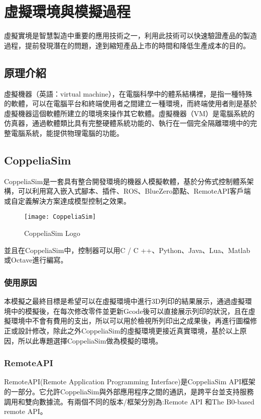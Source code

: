 \chapter{虛擬環境與模擬過程}

虛擬實境是智慧製造中重要的應用技術之一，利用此技術可以快速驗證產品的製造過程，提前發現潛在的問題，達到縮短產品上市的時間和降低生產成本的目的。\\

\section{原理介紹}

虛擬機器（英語：virtual machine），在電腦科學中的體系結構裡，是指一種特殊的軟體，可以在電腦平台和終端使用者之間建立一種環境，而終端使用者則是基於虛擬機器這個軟體所建立的環境來操作其它軟體。虛擬機器（VM）是電腦系統的仿真器，通過軟體類比具有完整硬體系統功能的、執行在一個完全隔離環境中的完整電腦系統，能提供物理電腦的功能。\\

\section{CoppeliaSim}
 CoppeliaSim是一套具有整合開發環境的機器人模擬軟體，基於分佈式控制體系架構，可以利用寫入嵌入式腳本、插件、ROS、BlueZero節點、RemoteAPI客戶端或自定義解決方案達成模型控制之效果。\\
\begin{figure}[htb]
\center
\texttt{[image: CoppeliaSim]}
\caption{\Large CoppeliaSim Logo}
\end{figure}

並且在CoppeliaSim中，控制器可以用C / C ++、Python、Java、Lua、Matlab或Octave進行編寫。\\
\subsection{使用原因}
 本模擬之最終目標是希望可以在虛擬環境中進行3D列印的結果展示，通過虛擬環境中的模擬後，在每次修改零件並更新Gcode後可以直接展示列印的狀況，且在虛擬環境中不會有費用的支出，所以可以用於檢視所列印出之成果後，再進行圖檔修正或設計修改，除此之外CoppeliaSim的虛擬環境更接近真實環境，基於以上原因，所以此專題選擇CoppeliaSim做為模擬的環境。\\
\subsection{RemoteAPI}
 RemoteAPI(Remote Application Programming Interface)是CoppeliaSim API框架的一部分。它允許CoppeliaSim與外部應用程序之間的通訊，是跨平台並支持服務調用和雙向數據流。有兩個不同的版本/框架分別為:Remote API 和The B0-based remote API。\\

